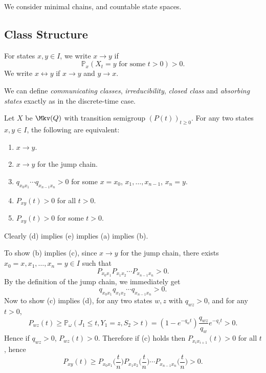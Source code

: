 \documentclass[12pt]{article}
\begin{document}
We consider minimal chains, and countable state spaces.

\subsection{Class Structure}
\label{sub:class_structure}

\begin{definition}
	For states $x, y \in I$, we write $x \to y$ if
	\[
		\mathbb{P}_x(X_t = y \text{ for some } t > 0) > 0
	.\]
	We write $x \leftrightarrow y$ if $x \to y$ and $y \to x$.

	We can define \emph{communicating classes}, \emph{irreducibility}, \emph{closed class} and \emph{absorbing states} exactly as in the discrete-time case.
\end{definition}

\begin{proposition}
	Let $X$ be $\Mkv(Q)$ with transition semigroup $(P(t))_{t \geq 0}$. For any two states $x, y \in I$, the following are equivalent:
	\begin{enumerate}[\normalfont(a)]
		\item $x \to y$.
		\item $x \to y$ for the jump chain.
		\item $q_{x_0x_1}\cdots q_{x_{n-1}x_n} > 0$ for some $x = x_0$, $x_1, \dots, x_{n-1}$, $x_n = y$.
		\item $P_{xy}(t) > 0$ for all $t > 0$.
		\item $P_{xy}(t) > 0$ for some $t > 0$.
	\end{enumerate}
\end{proposition}

\begin{proofbox}
	Clearly (d) implies (e) implies (a) implies (b).

	To show (b) implies (c), since $x \to y$ for the jump chain, there exists $x_0 = x, x_1, \dots, x_n = y \in I$ such that
	\[
	P_{x_0x_1}P_{x_1x_2} \cdots P_{x_{n-1}x_n} > 0
	.\]
	By the definition of the jump chain, we immediately get
	\[
	q_{x_0x_1} q_{x_1 x_2} \cdots q_{x_{n-1}x_n} > 0
	.\]
	Now to show (c) implies (d), for any two states $w, z$ with $q_{wz} > 0$, and for any $t > 0$,
	\[
	P_{wz}(t) \geq \mathbb{P}_{\omega} (J_1 \leq t, Y_1 = z, S_2 > t) = (1 - e^{-q_w t}) \frac{q_{wz}}{q_w} e^{-q_zt} > 0
	.\]
	Hence if $q_{wz} > 0$, $P_{wz}(t) > 0$. Therefore if (c) holds then $P_{x_ix_{i+1}}(t) > 0$ for all $t$, hence
	\[
	P_{xy}(t) \geq P_{x_0x_1}\biggl( \frac{t}{n} \biggr) P_{x_1x_2}\biggl( \frac{t}{n} \biggr)\cdots P_{x_{n-1}x_n}\biggl( \frac{t}{n} \biggr) > 0
	.\] 
\end{proofbox}
\end{document}
